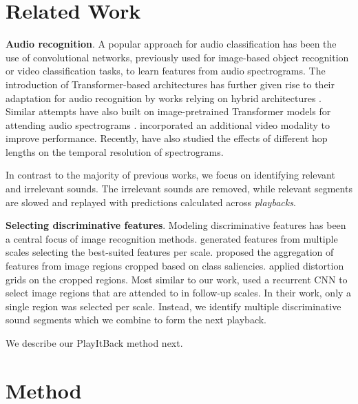 \documentclass{article}
\begin{document}
\section{Related Work}
\label{sec:related}

\noindent
\textbf{Audio recognition}. A popular approach for audio classification has been the use of convolutional networks, previously used for image-based object recognition \cite{gong2021psla,kong2020panns,wang2019comparison} or video classification \cite{kazakos2021slow} tasks, to learn features from audio spectrograms. The introduction of Transformer-based architectures has further given rise to their adaptation for audio recognition by works relying on hybrid architectures \cite{kong2020sound,gulati2020conformer,miyazaki2020convolution}. Similar attempts have also built on image-pretrained Transformer models for attending audio spectrograms \cite{chen2022hts,koutini2021efficient}. \cite{nagrani2021attention} incorporated an additional video modality to improve performance. 
Recently, \cite{liu2022learning} have also studied the effects of different hop lengths on the temporal resolution of spectrograms.


In contrast to the majority of previous works, we focus on identifying relevant and irrelevant sounds. The irrelevant sounds are removed, while relevant segments are slowed and replayed with predictions calculated across \textit{playbacks}. 





\noindent
\textbf{Selecting discriminative features}. Modeling discriminative features has been a central focus of image recognition methods. \cite{wang2017autoscaler} generated features from multiple scales selecting the best-suited features per scale. \cite{rosenfeld2016visual} proposed the aggregation of features from image regions cropped based on class saliencies. \cite{recasens2018learning} applied distortion grids on the cropped regions. Most similar to our work, \cite{fu2017look} used a recurrent CNN to select image regions that are attended to in follow-up scales. In their work, only a single region was selected per scale. 
Instead, we identify multiple discriminative sound segments which we combine to form the next playback.

We describe our PlayItBack method next.







\section{Method}
\label{sec:pagestyle}
\end{document}
